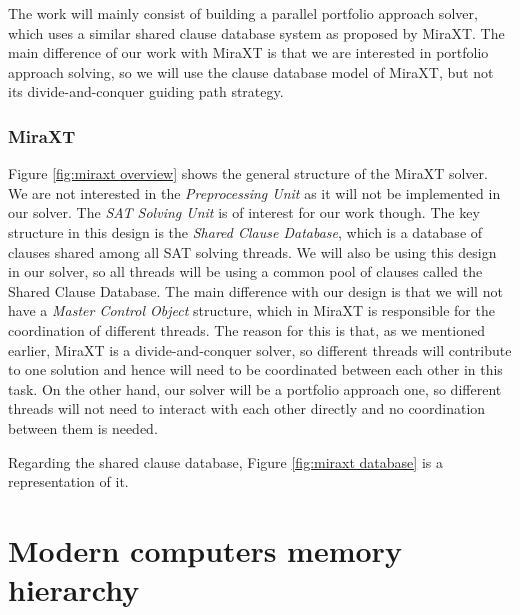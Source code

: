 \documentclass[12pt]{diicc}
\begin{document}
The work will mainly consist of building a parallel portfolio approach solver, which uses a similar shared clause database system as proposed by MiraXT. The main difference of our work with MiraXT is that we are interested in portfolio approach solving, so we will use the clause database model of MiraXT, but not its divide-and-conquer guiding path strategy. 

\subsubsection{MiraXT}

Figure \ref{fig:miraxt overview} shows the general structure of the MiraXT solver. We are not interested in the \textit{Preprocessing Unit} as it will not be implemented in our solver. The \textit{SAT Solving Unit} is of interest for our work though. The key structure in this design is the \textit{Shared Clause Database}, which is a database of clauses shared among all SAT solving threads. We will also be using this design in our solver, so all threads will be using a common pool of clauses called the Shared Clause Database. The main difference with our design is that we will not have a \textit{Master Control Object} structure, which in MiraXT is responsible for the coordination of different threads. The reason for this is that, as we mentioned earlier, MiraXT is a divide-and-conquer solver, so different threads will contribute to one solution and hence will need to be coordinated between each other in this task. On the other hand, our solver will be a portfolio approach one, so different threads will not need to interact with each other directly and no coordination between them is needed.

Regarding the shared clause database, Figure \ref{fig:miraxt database} is a representation of it. 

\section{Modern computers memory hierarchy}
\end{document}
